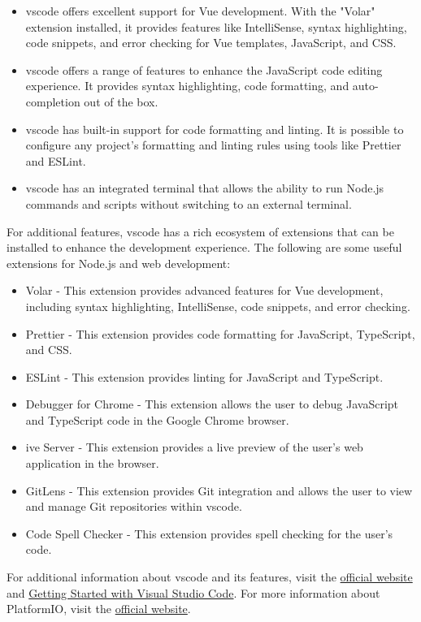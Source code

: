 \begin{itemize}
  \item \gls{vscode} offers excellent support for Vue development. With the "Volar" extension installed, it provides features like IntelliSense, syntax highlighting, code snippets, and error checking for Vue templates, JavaScript, and CSS.
  \item \gls{vscode} offers a range of features to enhance the JavaScript code editing experience. It provides syntax highlighting, code formatting, and auto-completion out of the box.
  \item \gls{vscode} has built-in support for code formatting and linting. It is possible to configure any project's formatting and linting rules using tools like Prettier and ESLint.
  \item \gls{vscode} has an integrated terminal that allows the ability to run Node.js commands and scripts without switching to an external terminal.
\end{itemize}
For additional features, \gls{vscode} has a rich ecosystem of extensions that can be installed to enhance the development experience. The following are some useful extensions for Node.js and web development: 
\begin{itemize}
  \item Volar - This extension provides advanced features for Vue development, including syntax highlighting, IntelliSense, code snippets, and error checking.
  \item Prettier - This extension provides code formatting for JavaScript, TypeScript, and CSS.
  \item ESLint - This extension provides linting for JavaScript and TypeScript.
  \item Debugger for Chrome - This extension allows the user to debug JavaScript and TypeScript code in the Google Chrome browser.
  \item ive Server - This extension provides a live preview of the user's web application in the browser.
  \item GitLens - This extension provides Git integration and allows the user to view and manage Git repositories within \gls{vscode}.
  \item Code Spell Checker - This extension provides spell checking for the user's code.
\end{itemize}
For additional information about \gls{vscode} and its features, visit the \href{https://code.visualstudio.com/}{official website} and \href{https://code.visualstudio.com/docs}{Getting Started with Visual Studio Code}. For more information about PlatformIO, visit the \href{https://platformio.org/}{official website}.
